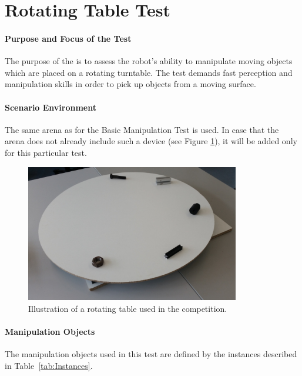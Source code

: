 \newpage
\section{Rotating Table Test}

\paragraph{Purpose and Focus of the Test}
The purpose of the  is to assess the robot's ability to manipulate moving objects which are placed on a rotating turntable. The test demands fast perception and manipulation skills in order to pick up objects from a moving surface.

\paragraph{Scenario Environment}
The same arena as for the Basic Manipulation Test is used. In case that the arena does not already include such a device (see Figure \ref{fig:conveyor_belt}), it will be added only for this particular test.

\begin{figure} [h!]
	\begin{center}
		\includegraphics[height = 6cm]{./images/rotating_table.jpg}
	\end{center}
	\caption{Illustration of a rotating table used in the competition.}
	\label{fig:conveyor_belt}
\end{figure}



\paragraph{Manipulation Objects}
The manipulation objects used in this test are defined by the instances described in Table~\ref{tab:Instances}.

